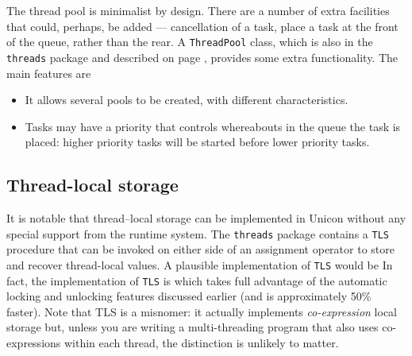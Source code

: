 The thread pool is minimalist by design. There are a number of extra facilities
that could, perhaps, be added --- cancellation of a task, place a task at the
front of the queue, rather than the rear. %
A \texttt{ThreadPool} class, which is also in the \texttt{threads} package
and described on page \pageref{ThreadPoolClass}, provides some extra
functionality. The main features are
\begin{itemize}
\item
  It allows several pools to be created, with different characteristics.
\item
  Tasks may have a priority that controls whereabouts in the queue the
  task is placed: higher priority tasks will be started before lower
  priority tasks.
\end{itemize}

\subsection*{Thread-local storage}
It is notable that thread--local storage can be implemented in Unicon without
any special support from the runtime system. The \texttt{threads} package
contains a \texttt{TLS}  procedure that can be invoked on either side of an assignment
operator to store and recover thread-local values. A plausible implementation of
\texttt{TLS} would be
\noindent
In fact, the implementation of \texttt{TLS} is
\noindent
which takes full advantage of the automatic locking and unlocking features
discussed earlier (and is approximately 50\% faster).
Note that TLS is a misnomer: it actually implements {\em co-expression} local
storage but, unless you are writing a multi-threading program that also uses
co-expressions within each thread, the distinction is unlikely to matter.



